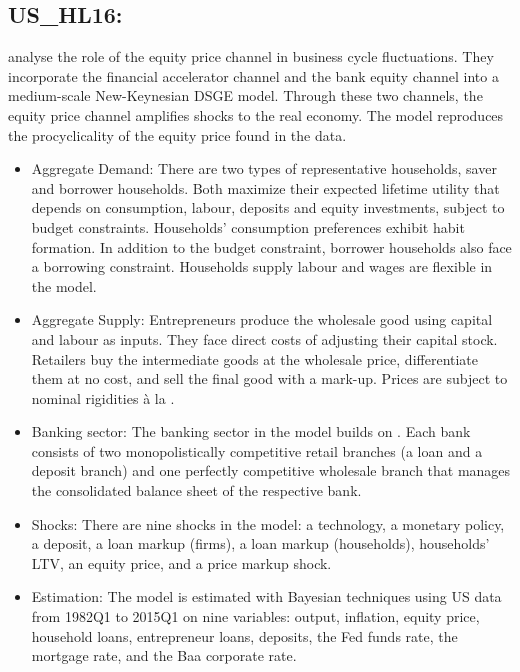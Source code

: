 \documentclass[11pt,a4paper]{article}
\begin{document}
	
	\subsection{US\_HL16: \texorpdfstring{\cite{hollander2016liu}}{Hollander and Liu (2016)}}
	\label{USHL16}
	\cite{hollander2016liu} analyse the role of the equity price channel in business cycle fluctuations. They incorporate the financial accelerator channel and the bank equity channel into a medium-scale New-Keynesian DSGE model. Through these two channels, the equity price channel amplifies shocks to the real economy. The model reproduces the procyclicality of the equity price found in the data.
	
	\begin{itemize}
		
		\item Aggregate Demand: There are two types of representative households, saver and borrower households. Both maximize their expected lifetime utility that depends on consumption, labour, deposits and equity investments, subject to budget constraints. Households' consumption preferences exhibit habit formation. In addition to the budget constraint, borrower households also face a borrowing constraint. Households supply labour and wages are flexible in the model.
		
		\item Aggregate Supply: Entrepreneurs produce the wholesale good using capital and labour as inputs. They face direct costs of adjusting their capital stock. Retailers buy the intermediate goods at the wholesale price, differentiate them at no cost, and sell the final good with a mark-up. Prices are subject to nominal rigidities \`{a}  la \cite{Calvo1983}.
		
		\item Banking sector: The banking sector in the model builds on \cite{Geralietal2010}. Each bank consists of two monopolistically competitive retail branches (a loan and a deposit branch) and one perfectly competitive wholesale branch that manages the consolidated balance sheet of the respective bank.
		
		\item Shocks: There are nine shocks in the model: a technology, a monetary policy, a deposit, a loan markup (firms), a loan markup (households), households' LTV, an equity price, and a price markup shock.
		
		\item Estimation: The model is estimated with Bayesian techniques using US data from 1982Q1 to 2015Q1 on nine variables: output, inflation, equity price, household loans, entrepreneur loans, deposits, the Fed funds rate, the mortgage rate, and the Baa corporate rate.
		
	\end{itemize}
	
\end{document}
